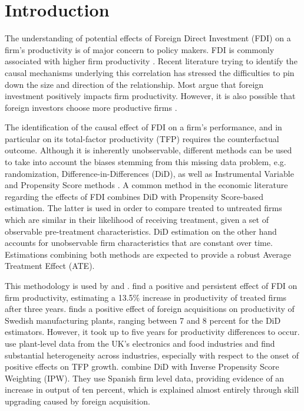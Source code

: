 \documentclass[a4paper,11pt]{scrartcl}
\begin{document}
\section{Introduction}

The understanding of potential effects of Foreign Direct Investment (FDI) on a firm's productivity is of major concern to policy makers. FDI is commonly associated with higher firm productivity \citep{girma2007}. 
Recent literature trying to identify the causal mechanisms underlying this correlation has stressed the difficulties to pin down the size and direction of the relationship. Most argue that foreign investment positively impacts firm productivity. However, it is also possible that foreign investors choose more productive firms \citep{arnold2009}.

The identification of the causal effect of FDI on a firm’s performance, and 
in particular on its total-factor productivity (TFP) requires the counterfactual outcome. Although it is inherently unobservable, different methods can be used to take into account the biases stemming from this missing data problem, e.g. randomization, Difference-in-Differences (DiD), as well as Instrumental Variable and Propensity Score methods \citep{karpaty2007}. A common method in the economic literature regarding the effects of FDI combines DiD with Propensity Score-based estimation. The latter is used in order to compare treated to untreated firms which are similar in their likelihood of receiving treatment, given a set of observable pre-treatment characteristics. 
DiD estimation on the other hand accounts for unobservable firm characteristics that are constant over time. Estimations combining both methods are expected to provide a robust Average Treatment Effect (ATE). 

This methodology is used by \citet{arnold2009, karpaty2007, girma2007} and \citet{schiffbauer2017}. \citet{arnold2009}  find a positive and persistent effect of FDI on firm productivity, estimating a 13.5\% increase in productivity of treated firms after three years. \citet{karpaty2007} finds a positive effect of foreign acquisitions on productivity of Swedish manufacturing plants, ranging between 7 and 8 percent for the DiD estimators. However, it took up to five years for productivity differences to occur. 
\citet{girma2007} use plant-level data from the UK's electronics and food industries and find substantial heterogeneity across industries, especially with respect to the onset of positive effects on TFP growth.  \citet{koch2019} combine DiD with Inverse Propensity Score Weighting (IPW). They use Spanish firm level data, providing evidence of an increase in output of ten percent, which is explained almost entirely through skill upgrading caused by foreign acquisition. 
\end{document}
